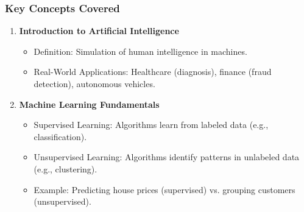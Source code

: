 \documentclass[aspectratio=169]{beamer}
\begin{document}
\begin{frame}[fragile]
    \frametitle{Key Concepts Covered}
    \begin{enumerate}
        \item \textbf{Introduction to Artificial Intelligence}
            \begin{itemize}
                \item Definition: Simulation of human intelligence in machines.
                \item Real-World Applications: Healthcare (diagnosis), finance (fraud detection), autonomous vehicles.
            \end{itemize}
        
        \item \textbf{Machine Learning Fundamentals}
            \begin{itemize}
                \item Supervised Learning: Algorithms learn from labeled data (e.g., classification).
                \item Unsupervised Learning: Algorithms identify patterns in unlabeled data (e.g., clustering).
                \item Example: Predicting house prices (supervised) vs. grouping customers (unsupervised).
            \end{itemize}
    \end{enumerate}
\end{frame}
\end{document}
